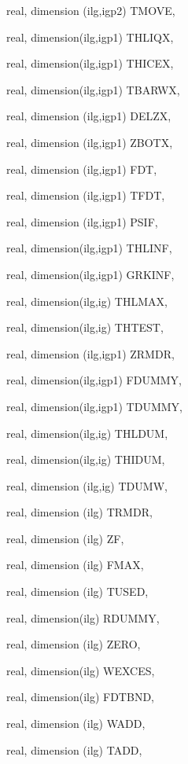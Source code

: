 {\begin{DoxyParamCaption}
\item[{real, dimension (ilg,igp2)}]{T\+M\+O\+V\+E, }
\item[{real, dimension(ilg,igp1)}]{T\+H\+L\+I\+Q\+X, }
\item[{real, dimension(ilg,igp1)}]{T\+H\+I\+C\+E\+X, }
\item[{real, dimension(ilg,igp1)}]{T\+B\+A\+R\+W\+X, }
\item[{real, dimension (ilg,igp1)}]{D\+E\+L\+Z\+X, }
\item[{real, dimension (ilg,igp1)}]{Z\+B\+O\+T\+X, }
\item[{real, dimension   (ilg,igp1)}]{F\+D\+T, }
\item[{real, dimension  (ilg,igp1)}]{T\+F\+D\+T, }
\item[{real, dimension  (ilg,igp1)}]{P\+S\+I\+F, }
\item[{real, dimension(ilg,igp1)}]{T\+H\+L\+I\+N\+F, }
\item[{real, dimension(ilg,igp1)}]{G\+R\+K\+I\+N\+F, }
\item[{real, dimension(ilg,ig)}]{T\+H\+L\+M\+A\+X, }
\item[{real, dimension(ilg,ig)}]{T\+H\+T\+E\+S\+T, }
\item[{real, dimension (ilg,igp1)}]{Z\+R\+M\+D\+R, }
\item[{real, dimension(ilg,igp1)}]{F\+D\+U\+M\+M\+Y, }
\item[{real, dimension(ilg,igp1)}]{T\+D\+U\+M\+M\+Y, }
\item[{real, dimension(ilg,ig)}]{T\+H\+L\+D\+U\+M, }
\item[{real, dimension(ilg,ig)}]{T\+H\+I\+D\+U\+M, }
\item[{real, dimension (ilg,ig)}]{T\+D\+U\+M\+W, }
\item[{real, dimension (ilg)}]{T\+R\+M\+D\+R, }
\item[{real, dimension    (ilg)}]{Z\+F, }
\item[{real, dimension  (ilg)}]{F\+M\+A\+X, }
\item[{real, dimension (ilg)}]{T\+U\+S\+E\+D, }
\item[{real, dimension(ilg)}]{R\+D\+U\+M\+M\+Y, }
\item[{real, dimension  (ilg)}]{Z\+E\+R\+O, }
\item[{real, dimension(ilg)}]{W\+E\+X\+C\+E\+S, }
\item[{real, dimension(ilg)}]{F\+D\+T\+B\+N\+D, }
\item[{real, dimension  (ilg)}]{W\+A\+D\+D, }
\item[{real, dimension  (ilg)}]{T\+A\+D\+D, }

\end{DoxyParamCaption}}
